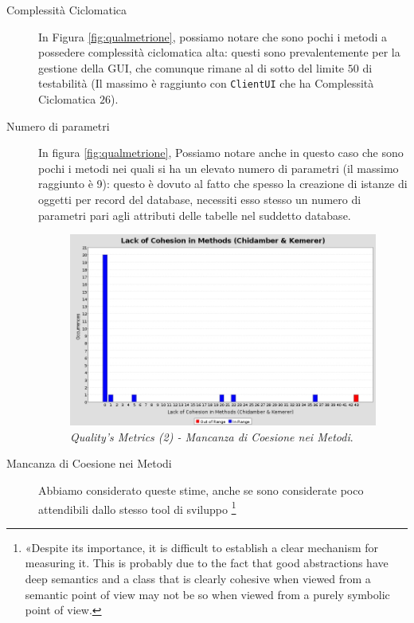 \begin{description}
\item[Complessità Ciclomatica] In Figura \vref{fig:qualmetrione},
	possiamo notare che sono pochi i metodi a possedere complessità ciclomatica
	alta: questi sono prevalentemente per la gestione della GUI, che comunque
	rimane al di sotto del limite $50$ di testabilità (Il massimo è raggiunto
	con \texttt{ClientUI} che ha Complessità Ciclomatica $26$).
\item[Numero di parametri] In figura \vref{fig:qualmetrione},
	Possiamo notare anche in questo caso che sono pochi i metodi nei quali
	si ha un elevato numero di parametri (il massimo raggiunto è 9): questo
	è dovuto al fatto che spesso la creazione di istanze di oggetti per 
	record del database, necessiti esso stesso un numero di parametri pari
	agli attributi delle tabelle nel suddetto database.
\begin{figure}
\centering
\includegraphics[scale=0.5]{lastdiagrs/ackOfCohesionInMethods_chidamberKemerer}
\caption{\textit{Quality's Metrics (2) - Mancanza di Coesione nei Metodi}.}
\label{fig:qomlackcohesion}
\end{figure}
\item[Mancanza di Coesione nei Metodi] Abbiamo considerato queste stime, anche
	se sono considerate poco attendibili dallo stesso tool di sviluppo
	\footnote{«Despite its importance, it is difficult to establish a clear 
	mechanism for measuring it. This is probably due to the fact that good 
	abstractions have deep semantics and a class that is clearly cohesive 
	when viewed from a semantic point of view may not be so when viewed from
	 a purely symbolic point of view.

}
\end{description}
